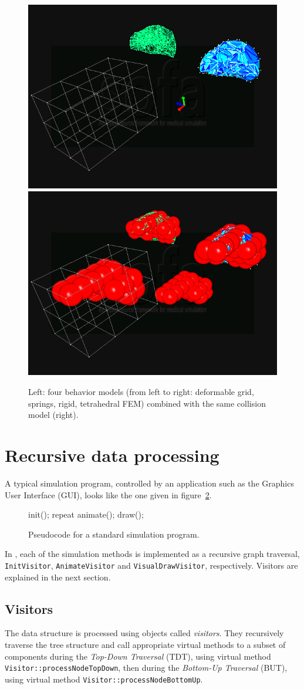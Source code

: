 \begin{figure}
 \centering
 \includegraphics[width=0.4\linewidth]{demoLiverFall1.png}
 \includegraphics[width=0.4\linewidth]{demoLiverFall2.png}
 \caption{Left: four behavior models (from left to right: deformable grid, springs, rigid, tetrahedral FEM) combined with the same collision model (right).}
 \label{fig:behaviormodels}
\end{figure}


\section{Recursive data processing}
A typical simulation program, controlled by an application such as the Graphics User Interface (GUI), looks like the one given in figure~\ref{pc:animationloop}.
\begin{figure}
\begin{code_cpp}
init();
repeat {
    animate();
    draw();
}
\end{code_cpp}
\caption{Pseudocode for a standard simulation program.}
\label{pc:animationloop}
\end{figure}
In \sofa, each of the simulation methods is implemented as a recursive graph traversal, \texttt{InitVisitor}, \texttt{AnimateVisitor} and \texttt{VisualDrawVisitor}, respectively. 
Visitors are explained in the next section.

\subsection{Visitors}
The data structure is processed using objects called \emph{visitors}.
They recursively traverse the tree structure and call appropriate virtual methods to a subset of components during the \textit{Top-Down Traversal} (TDT), using virtual method \texttt{Visitor::processNodeTopDown}, then during the \textit{Bottom-Up Traversal} (BUT), using virtual method \texttt{Visitor::processNodeBottomUp}.

